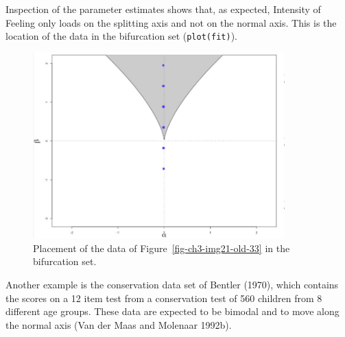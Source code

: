 \documentclass[
  letterpaper,
]{scrbook}
\begin{document}
Inspection of the parameter estimates shows that, as expected, Intensity
of Feeling only loads on the splitting axis and not on the normal axis.
This is the location of the data in the bifurcation set
(\texttt{plot(fit)}).

\begin{figure}

{\centering \includegraphics[width=3.81841in,height=2.82613in]{media/ch3/image24.jpg}

}

\caption{\label{fig-ch3-img24-old-36}Placement of the data of
Figure~\ref{fig-ch3-img21-old-33} in the bifurcation set.}

\end{figure}

Another example is the conservation data set of Bentler (1970), which
contains the scores on a 12 item test from a conservation test of 560
children from 8 different age groups. These data are expected to be
bimodal and to move along the normal axis (Van der Maas and Molenaar
1992b).
\end{document}

